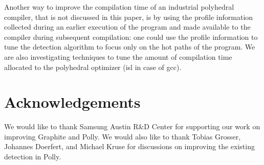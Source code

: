 \documentclass{sig-alternate}
\begin{document}
Another way to improve the compilation time of an industrial polyhedral
compiler, that is not discussed in this paper, is by using the profile
information collected during an earlier execution of the program and made
available to the compiler during subsequent compilation: one could use the
profile information to tune the \SCoP{} detection algorithm to focus only on the
hot paths of the program.  We are also investigating techniques to tune the
amount of compilation time allocated to the polyhedral optimizer (isl
\cite{verdoolaege2010isl} in case of gcc).

\section{Acknowledgements}
We would like to thank Samsung Austin R\&D Center for supporting our work on
improving Graphite and Polly.  We would also like to thank Tobias Grosser,
Johannes Doerfert, and Michael Kruse for discussions on improving the existing
\SCoP{} detection in Polly.



{\small

}
\end{document}
